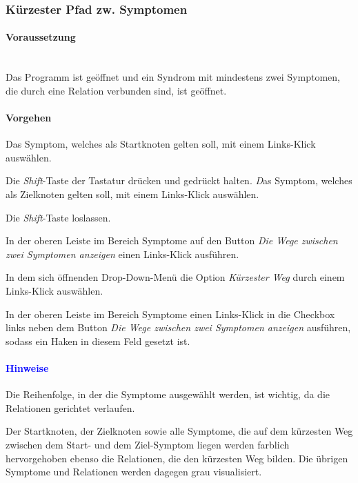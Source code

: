 \documentclass[enabledeprecatedfontcommands,fontsize=11pt,paper=a4,twoside]{scrartcl}
\newcounter{one}
\newcounter{two}[one]
\newcommand*{\hint}{\paragraph{\textcolor{blue}{Hinweise}}}
\newcommand*{\condition}{\paragraph{Voraussetzung}$\;$ \vspace{0.2cm}\\}
\newcommand*{\action}{\paragraph{Vorgehen}}
\let\tempone\itemize
\let\temptwo\enditemize
\renewenvironment{itemize}{\tempone\addtolength{\itemsep}{-10.0pt}}{\temptwo}
\let\origenumerate\enumerate
\let\origendenumerate\endenumerate
\renewenvironment{enumerate}{\origenumerate \addtolength{\itemsep}{-10.0pt}}{\origendenumerate}
\begin{document}
\newpage
\subsubsection{Kürzester Pfad zw. Symptomen}
	\condition 
		Das Programm ist geöffnet und ein Syndrom mit mindestens zwei Symptomen, die durch eine Relation verbunden sind, ist geöffnet.
	\action
	\begin{enumerate}
		\item Das Symptom, welches als Startknoten gelten soll, mit einem Links-Klick auswählen.
		\item Die \textit{Shift}-Taste der Tastatur drücken und gedrückt halten.
		\textit Das Symptom, welches als Zielknoten gelten soll, mit einem Links-Klick auswählen.
		\item Die \textit{Shift}-Taste loslassen.
		\item In der oberen Leiste im Bereich Symptome auf den Button \textit{Die Wege zwischen zwei Symptomen anzeigen} einen Links-Klick ausführen.
		\item In dem sich öffnenden Drop-Down-Menü die Option \textit{Kürzester Weg} durch einem Links-Klick auswählen.
		\item In der oberen Leiste im Bereich Symptome einen Links-Klick in die Checkbox links neben dem Button \textit{Die Wege zwischen zwei Symptomen anzeigen} ausführen, sodass ein Haken in diesem Feld gesetzt ist.
	\end{enumerate} 
	\hint
	\begin{itemize}
		\item Die Reihenfolge, in der die Symptome ausgewählt werden, ist wichtig, da die Relationen gerichtet verlaufen. 
		\item Der Startknoten, der Zielknoten sowie alle Symptome, die auf dem kürzesten Weg zwischen dem Start- und dem Ziel-Symptom liegen werden farblich hervorgehoben ebenso die Relationen, die den kürzesten Weg bilden. Die übrigen Symptome und Relationen werden dagegen grau visualisiert. \\
	\end{itemize}

\end{document}
